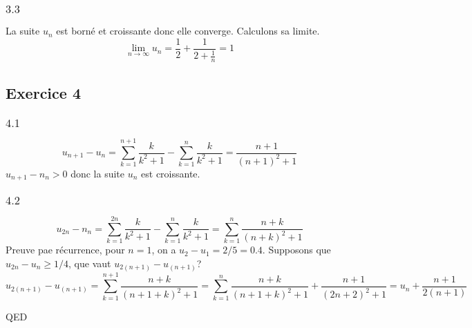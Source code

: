 \documentclass[]{book}
\theoremstyle{definition}
\begin{document}
\subsubsection*{$3.3$}
La suite $u_n$ est born\'e et croissante donc elle converge. Calculons sa limite.
$$\lim_{n\to\infty} u_n = \frac{1}{2}+\frac{1}{2+\frac{1}{n}} = 1$$


\subsection*{Exercice 4}
\subsubsection*{$4.1$}
$$u_{n+1}-u_{n} = \sum_{k=1}^{n+1}\frac{k}{k^2+1} - \sum_{k=1}^{n}\frac{k}{k^2+1} = \frac{n+1}{(n+1)^2+1}$$
$u_{n+1}-n_{n} > 0$ donc la suite $u_n$ est croissante.

\subsubsection*{$4.2$}
$$u_{2n}-n_{n} = \sum_{k=1}^{2n}\frac{k}{k^2+1} - \sum_{k=1}^{n}\frac{k}{k^2+1} = \sum_{k=1}^{n}{\frac{n+k}{(n+k)^2+1}}$$
Preuve pae r\'ecurrence, pour $n=1$, on a $u_2-u_1=2/5=0.4$. Supposons que $u_{2n}-u_{n} \geq 1/4$, que vaut $u_{2(n+1)} - u_{(n+1)}$?
$$u_{2(n+1)} - u_{(n+1)} = \sum_{k=1}^{n+1}{\frac{n+k}{(n+1+k)^2+1}} = \sum_{k=1}^{n}{\frac{n+k}{(n+1+k)^2+1}} + \frac{n+1}{(2n+2)^2+1} = u_n + \frac{n+1}{2(n+1)}$$


QED
\end{document}
